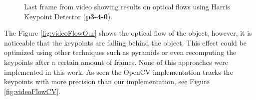 \documentclass[12pt,a4paper]{article}
\begin{document}
\begin{figure}[!h]
	\centering
	\enskip
	\caption{Last frame from video showing results on optical flows using Harris Keypoint Detector (\textbf{p3-4-0}).}
	\label{fig:flowVideo}
\end{figure}

The Figure \ref{fig:videoFlowOur} shows the optical flow of the object, however, it is noticeable that the keypoints are falling behind the object. This effect could be optimized using other techniques such as pyramids or even recomputing the keypoints after a certain amount of frames. None of this approaches were implemented in this work. As seen the OpenCV implementation tracks the keypoints with more precision than our implementation, see Figure \ref{fig:videoFlowCV}.  \\
\end{document}
